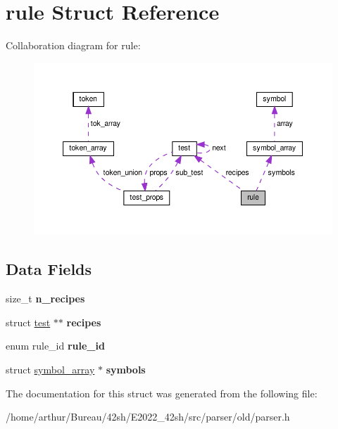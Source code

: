 \hypertarget{structrule}{}\section{rule Struct Reference}
\label{structrule}


Collaboration diagram for rule\+:
\nopagebreak
\begin{figure}[H]
\begin{center}
\leavevmode
\includegraphics[width=350pt]{structrule__coll__graph}
\end{center}
\end{figure}
\subsection*{Data Fields}
\begin{DoxyCompactItemize}
\item 
\mbox{\label{structrule_a90e23deafb5be3a049e10a4d23f7ec4e}} 
size\+\_\+t {\bfseries n\+\_\+recipes}
\item 
\mbox{\label{structrule_ae23909fa80aee3d474109380cdd08d4a}} 
struct \hyperlink{structtest}{test} $\ast$$\ast$ {\bfseries recipes}
\item 
\mbox{\label{structrule_a7fc88fb764d00007bd9536355e1457ca}} 
enum rule\+\_\+id {\bfseries rule\+\_\+id}
\item 
\mbox{\label{structrule_a909d45a99b4ba7398b98f55fb167256f}} 
struct \hyperlink{structsymbol__array}{symbol\+\_\+array} $\ast$ {\bfseries symbols}
\end{DoxyCompactItemize}


The documentation for this struct was generated from the following file\+:\begin{DoxyCompactItemize}
\item 
/home/arthur/\+Bureau/42sh/\+E2022\+\_\+42sh/src/parser/old/parser.\+h\end{DoxyCompactItemize}
